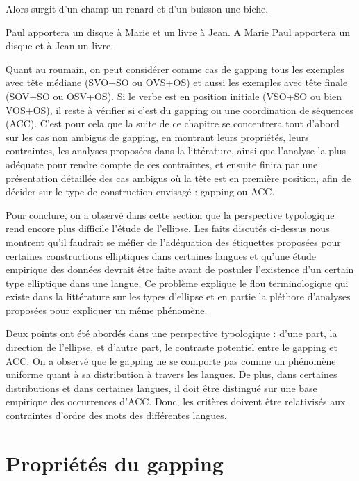 \ea
Alors surgit d’un champ un renard et d’un buisson une biche. \label{ch2:ex20}
\z

\ea \label{ch2:ex21}
\ea Paul apportera un disque à Marie et un livre à Jean. 
\ex A Marie Paul apportera un disque et à Jean un livre. 
\z
\z

Quant au roumain, on peut considérer comme cas de gapping tous les exemples avec tête médiane (SVO+SO ou OVS+OS) et aussi les exemples avec tête finale (SOV+SO ou OSV+OS). Si le verbe est en position initiale (VSO+SO ou bien VOS+OS), il reste à vérifier si c’est du gapping ou une coordination de séquences (ACC). C’est pour cela que la suite de ce chapitre se concentrera tout d’abord sur les cas non ambigus de gapping, en montrant leurs propriétés, leurs contraintes, les analyses proposées dans la littérature, ainsi que l’analyse la plus adéquate pour rendre compte de ces contraintes, et ensuite finira par une présentation détaillée des cas ambigus où la tête est en première position, afin de décider sur le type de construction envisagé : gapping ou ACC. 

Pour conclure, on a observé dans cette section que la perspective typologique rend encore plus difficile l’étude de l’ellipse. Les faits discutés ci-dessus nous montrent qu’il faudrait se méfier de l’adéquation des étiquettes proposées pour certaines constructions elliptiques dans certaines langues et qu’une étude empirique des données devrait être faite avant de postuler l’existence d’un certain type elliptique dans une langue. Ce problème explique le flou terminologique qui existe dans la littérature sur les types d’ellipse et en partie la pléthore d’analyses proposées pour expliquer un même phénomène. 

Deux points ont été abordés dans une perspective typologique : d’une part, la direction de l’ellipse, et d’autre part, le contraste potentiel entre le gapping et ACC. On a observé que le gapping ne se comporte pas comme un phénomène uniforme quant à sa distribution à travers les langues. De plus, dans certaines distributions et dans certaines langues, il doit être distingué sur une base empirique des occurrences d’ACC. Donc, les critères doivent être relativisés aux contraintes d’ordre des mots des différentes langues.

\newpage
\section{Propriétés du gapping} \label{ch2:sect2.3}

